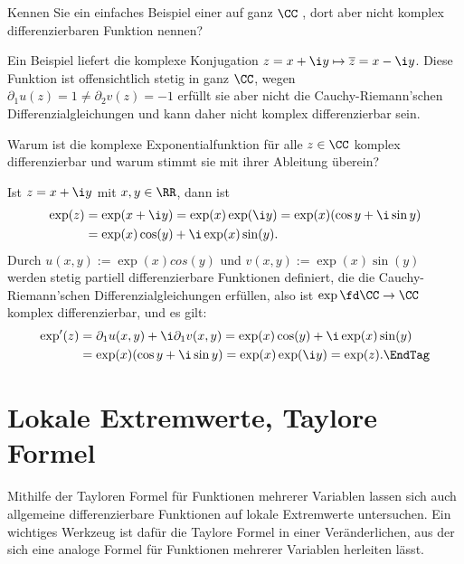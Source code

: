 \begin{frage}
  Kennen Sie ein einfaches Beispiel einer auf ganz $\CC$ , 
  dort aber nicht komplex differenzierbaren Funktion nennen?
\end{frage}

\begin{antwort}
  Ein Beispiel liefert die komplexe Konjugation 
  $z = x+\i y \mapsto \overline{z} = x-\i y$. 
  Diese Funktion ist offensichtlich 
  stetig in ganz $\CC$, wegen 
  $\partial_1 u(z) =1 \not= \partial_2 v(z) = -1 $ erfüllt sie  
  aber nicht die Cauchy-Riemann'schen Differenzialgleichungen 
  und kann daher nicht komplex differenzierbar sein.  
  \AntEnd 
  
\end{antwort} 

\begin{frage}
  Warum ist die komplexe Exponentialfunktion für alle $z\in\CC$ komplex 
  differenzierbar und warum stimmt sie mit ihrer Ableitung überein?
\end{frage}

\begin{antwort}
  Ist $z=x+\i y$ mit $x,y\in\RR$, dann ist 
  \begin{align*}
    \exp (z) &= \exp( x+\i y) = \exp(x) \exp(\i y) = 
    \exp(x) ( \cos y+ \i \sin y) \\
    &= 
    \exp (x) \cos(y) + \i \exp(x)\sin(y).
  \end{align*}
  Durch $u(x,y):=\exp(x)cos(y)$ und $v(x,y):=\exp(x)\sin(y)$ werden stetig 
  partiell differenzierbare Funktionen definiert, die die Cauchy-Riemann'schen 
  Differenzialgleichungen erfüllen, also ist $\exp \fd \CC\to\CC$ 
  komplex differenzierbar, und es gilt:
  \begin{align*}
    \exp'(z) &= \partial_1 u(x,y) + \i \partial_1  v(x,y) = 
    \exp(x) \cos(y) + \i \exp(x) \sin(y) \\
    &= \exp(x) ( \cos y+\i \sin y ) = 
    \exp( x ) \exp(\i y ) = \exp (z). \EndTag
  \end{align*} 
  
\end{antwort}



\section{Lokale Extremwerte, Taylor\sch e Formel}

Mithilfe der Taylor\sch en Formel für Funktionen mehrerer Variablen lassen 
sich auch allgemeine 
differenzierbare Funktionen auf lokale Extremwerte untersuchen. 
Ein wichtiges Werkzeug ist dafür die Taylor\sch e Formel in 
einer Veränderlichen, aus der sich eine analoge 
Formel für Funktionen mehrerer Variablen herleiten lässt. 


